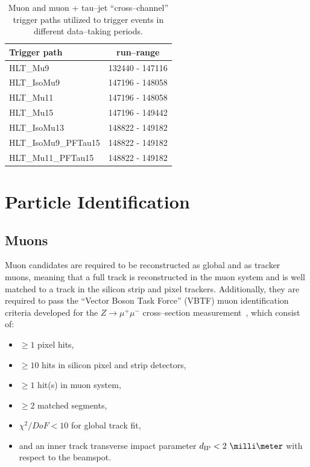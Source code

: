 \begin{table}[t]
\begin{center}

\begin{tabular}{|l|c|}
\hline
Trigger path & run--range \\
\hline
HLT\_Mu9             & 132440 - 147116 \\
HLT\_IsoMu9          & 147196 - 148058 \\
HLT\_Mu11            & 147196 - 148058 \\
HLT\_Mu15            & 147196 - 149442 \\
HLT\_IsoMu13         & 148822 - 149182 \\
HLT\_IsoMu9\_PFTau15 & 148822 - 149182 \\
HLT\_Mu11\_PFTau15   & 148822 - 149182 \\
\hline
\end{tabular}
\end{center}
\begin{center}
\caption[High Level Trigger paths used to select $\mu + \tau_h$ events]{\captiontext
Muon and muon + tau--jet ``cross--channel'' trigger paths utilized to trigger
events in different data--taking periods.}
\label{tab:AHtoMuTauTriggers}
\end{center}
\end{table}

\section{Particle Identification}
\subsection{Muons}
\label{sec:MuonId}

Muon candidates are required to be reconstructed as global and as tracker muons,
meaning that a full track is reconstructed in the muon system and is well
matched to a track in the silicon strip and pixel trackers.
Additionally, they are required to pass the ``Vector Boson Task Force'' (VBTF)
muon identification criteria developed for the $Z \to \mu^{+} \mu^{-}$
cross--section measurement~\cite{CMS-PAS-EWK-10-002}, which consist of:
\begin{itemize}
\item $\geq 1$ pixel hits,
\item $\geq 10$ hits in silicon pixel and strip detectors,
\item $\geq 1$ hit(s) in muon system,
\item $\geq 2$ matched segments,
\item $\chi^{2}/DoF < 10$ for global track fit,
\item and an inner track transverse impact parameter $d_\text{IP} < 2~\milli\meter$
  with respect to the beamspot.
\end{itemize}

